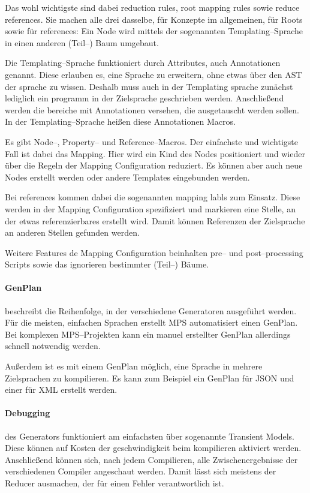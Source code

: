 Das wohl wichtigste sind dabei {\ttfamily reduction rules}, {\ttfamily root mapping rules} sowie {\ttfamily reduce references}.
Sie machen alle drei dasselbe, für Konzepte im allgemeinen, für Roots sowie für {\ttfamily references}: Ein Node wird mittels der sogenannten Templating--Sprache in einen anderen (Teil--) Baum umgebaut.

Die Templating--Sprache funktioniert durch Attributes, auch Annotationen genannt.
Diese erlauben es, eine Sprache zu erweitern, ohne etwas über den \ac{AST} der sprache zu wissen.
Deshalb muss auch in der Templating sprache zunächst lediglich ein programm in der Zielsprache geschrieben werden.
Anschließend werden die bereiche mit Annotationen versehen, die ausgetauscht werden sollen.
In der Templating--Sprache heißen diese Annotationen Macros.

Es gibt Node--, Property-- und Reference--Macros.
Der einfachste und wichtigste Fall ist dabei das Mapping.
Hier wird ein Kind des Nodes positioniert und wieder über die Regeln der {\ttfamily Mapping Configuration} reduziert.
Es können aber auch neue Nodes erstellt werden oder andere Templates eingebunden werden.

Bei {\ttfamily references} kommen dabei die sogenannten {\ttfamily mapping labls} zum Einsatz.
Diese werden in der {\ttfamily Mapping Configuration} spezifiziert und markieren eine Stelle, an der etwas referenzierbares erstellt wird.
Damit können Referenzen der Zielsprache an anderen Stellen gefunden werden.

Weitere Features de {\ttfamily Mapping Configuration} beinhalten pre-- und post--processing Scripts sowie das ignorieren bestimmter (Teil--) Bäume.

\paragraph{GenPlan} beschreibt die Reihenfolge, in der verschiedene Generatoren ausgeführt werden.
Für die meisten, einfachen Sprachen erstellt \ac{MPS} automatisiert einen GenPlan.
Bei komplexen \ac{MPS}--Projekten kann ein manuel erstellter GenPlan allerdings schnell notwendig werden.

Außerdem ist es mit einem GenPlan möglich, eine Sprache in mehrere Zielsprachen zu kompilieren.
Es kann zum Beispiel ein GenPlan für \ac{JSON} und einer für \ac{XML} erstellt werden.

\paragraph{Debugging} des Generators funktioniert am einfachsten über sogenannte Transient Models.
Diese können auf Kosten der geschwindigkeit beim kompilieren aktiviert werden.
Anschließend können sich, nach jedem Compilieren, alle Zwischenergebnisse der verschiedenen Compiler angeschaut werden.
Damit lässt sich meistens der Reducer ausmachen, der für einen Fehler verantwortlich ist.

